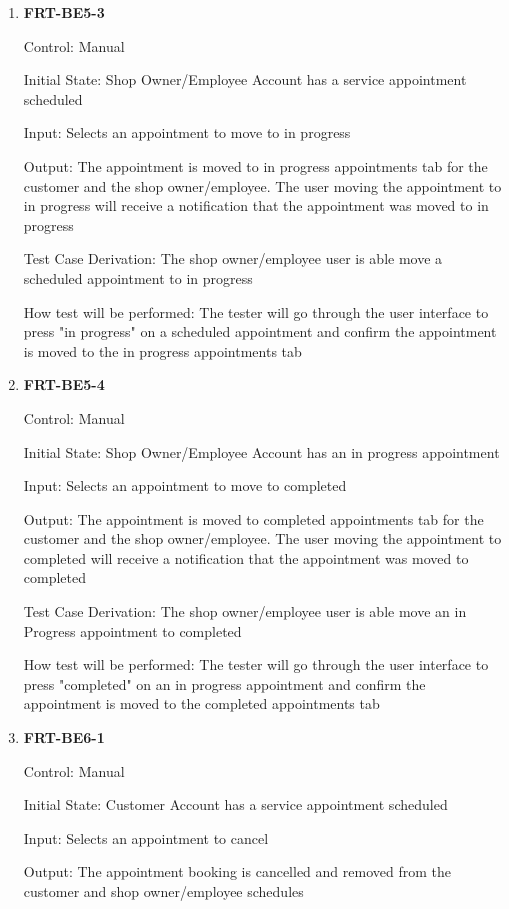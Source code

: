 \documentclass[12pt, titlepage]{article}
\begin{document}
\begin{enumerate}
	\item \textbf{FRT-BE5-3}

	      Control: Manual

	      Initial State: Shop Owner/Employee Account has a service appointment scheduled

	      Input: Selects an appointment to move to in progress

	      Output: The appointment is moved to in progress appointments tab for the customer and the shop
	      owner/employee. The user moving the appointment to in progress will receive a notification that the
	      appointment was moved to in progress

	      Test Case Derivation: The shop owner/employee user is able move a scheduled appointment to in
	      progress

	      How test will be performed: The tester will go through the user interface to press "in progress" on
	      a scheduled appointment and confirm the appointment is moved to the in progress appointments tab

	\item \textbf{FRT-BE5-4}

	      Control: Manual

	      Initial State: Shop Owner/Employee Account has an in progress appointment

	      Input: Selects an appointment to move to completed

	      Output: The appointment is moved to completed appointments tab for the customer and the shop
	      owner/employee. The user moving the appointment to completed will receive a notification that the
	      appointment was moved to completed

	      Test Case Derivation: The shop owner/employee user is able move an in Progress appointment to
	      completed

	      How test will be performed: The tester will go through the user interface to press "completed" on
	      an in progress appointment and confirm the appointment is moved to the completed appointments tab

	\item \textbf{FRT-BE6-1}

	      Control: Manual

	      Initial State: Customer Account has a service appointment scheduled

	      Input: Selects an appointment to cancel

	      Output: The appointment booking is cancelled and removed from the customer and shop owner/employee
	      schedules


\end{enumerate}
\end{document}
